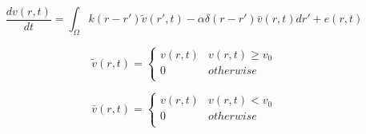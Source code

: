 \documentclass[onecolumn,draftcls]{IEEEtran}
\begin{document}
\begin{equation}\label{new_spatiotemporal_kernels}
\frac{{dv\left( {r,t} \right)}}{{dt}} = \int_\Omega  {k\left( {r - r'} \right)\tilde v\left( {r',t} \right) - \alpha \delta \left( {r - r'} \right)\bar v\left( {r,t} \right)dr'}  + e\left( {r,t} \right)
\end{equation}

\begin{equation}\label{define_v_tilde}
\tilde v\left( {r,t} \right) = \left\{ {\begin{array}{*{20}{c}}
   {v\left( {r,t} \right)} & {v\left( {r,t} \right) \ge {v_0}}  \\
   0 & {otherwise}  \\
\end{array}} \right.
\end{equation}

\begin{equation}\label{define_v_bar}
\bar v\left( {r,t} \right) = \left\{ {\begin{array}{*{20}{c}}
   {v\left( {r,t} \right)} & {v\left( {r,t} \right) < {v_0}}  \\
   0 & {otherwise}  \\
\end{array}} \right.
\end{equation}
\end{document}

